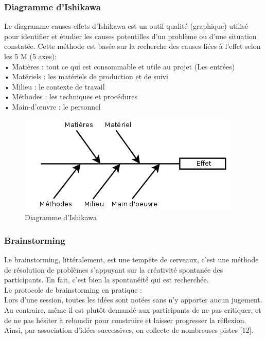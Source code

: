 \documentclass[12pt, a4paper]{thesis}
\begin{document}
\subsubsection{Diagramme d’Ishikawa}

Le diagramme causes-effets d'Ishikawa est un outil qualité (graphique) utilisé pour identifier et étudier les causes potentilles d'un problème ou d’une situation constatée. 
Cette méthode est basée sur la recherche des causes liées à l’effet selon les 5 M (5 axes):\\
•	Matières : tout ce qui est consommable et utile au projet (Les entrées)\\
•	Matériels : les matériels de production et de suivi\\
•	Milieu : le contexte de travail \\
•	Méthodes : les techniques et procédures\\
•	Main-d'œuvre : le personnel \\


\begin{figure}[!h]
\begin{center}
        \includegraphics[scale=0.75]{chika.png}
        \caption{Diagramme d’Ishikawa}
\end{center}
\end{figure}


\subsubsection{Brainstorming}
Le brainstorming, littéralement, est une tempête de cerveaux, c'est une méthode de résolution de problèmes s'appuyant sur la créativité spontanée des participants. En fait, c'est bien la spontanéité qui est recherchée.\\
Le protocole de brainstorming en pratique :\\
Lors d'une session, toutes les idées sont notées sans n’y apporter aucun jugement. Au contraire, même il est plutôt demandé aux participants de ne pas critiquer, et de ne pas hésiter à rebondir pour construire et laisser progresser la réflexion. Ainsi, par association d'idées successives, on collecte de nombreuses pistes [12].\\
\end{document}
